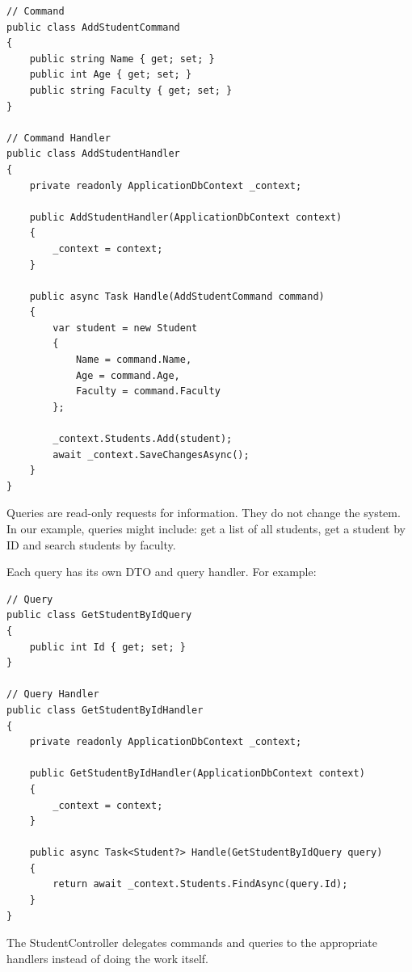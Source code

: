 \begin{lstlisting}
// Command
public class AddStudentCommand
{
    public string Name { get; set; }
    public int Age { get; set; }
    public string Faculty { get; set; }
}

// Command Handler
public class AddStudentHandler
{
    private readonly ApplicationDbContext _context;

    public AddStudentHandler(ApplicationDbContext context)
    {
        _context = context;
    }

    public async Task Handle(AddStudentCommand command)
    {
        var student = new Student
        {
            Name = command.Name,
            Age = command.Age,
            Faculty = command.Faculty
        };

        _context.Students.Add(student);
        await _context.SaveChangesAsync();
    }
}

\end{lstlisting}


Queries are read-only requests for information. They do not change the system. In our example, queries might include: get a list of all students, get a student by ID and search students by faculty.

Each query has its own DTO and query handler. For example:

\begin{lstlisting}
// Query
public class GetStudentByIdQuery
{
    public int Id { get; set; }
}

// Query Handler
public class GetStudentByIdHandler
{
    private readonly ApplicationDbContext _context;

    public GetStudentByIdHandler(ApplicationDbContext context)
    {
        _context = context;
    }

    public async Task<Student?> Handle(GetStudentByIdQuery query)
    {
        return await _context.Students.FindAsync(query.Id);
    }
}

\end{lstlisting}



The StudentController delegates commands and queries to the appropriate handlers instead of doing the work itself.

